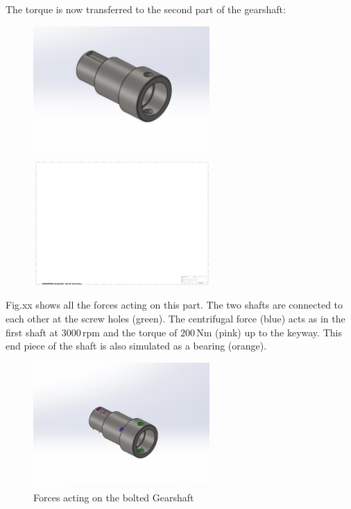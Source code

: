 The torque is now transferred to the second part of the gearshaft:

\begin{figure}[H]
\centering
\includegraphics[width=0.6\textwidth]{texfiles/mech/eimg/propulsion/picture_gearshaft_left}
\caption{}
\label{}
\end{figure}

\begin{figure}[H]
\centering
\includegraphics[width=0.6\textwidth]{texfiles/mech/eimg/propulsion/spaceholder_technical_drawing}
\caption{}
\label{}
\end{figure}

Fig.xx shows all the forces acting on this part. The two shafts are connected to each other at the screw holes (green). The centrifugal force (blue) acts as in the first shaft at \(3000 \, \text{rpm}\) and the torque of \(200 \, \text{Nm}\) (pink) up to the keyway. This end piece of the shaft is also simulated as a bearing (orange).

\begin{figure}[H]
\centering
\includegraphics[width=0.6\textwidth]{texfiles/mech/eimg/propulsion/picture_forces_gearshaft_left}
\caption{Forces acting on the bolted Gearshaft}
\label{fig:gearshaft_left_forces}
\end{figure}

